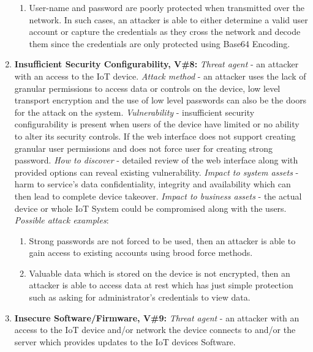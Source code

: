 \documentclass[12pt]{article}
\begin{document}
\begin{enumerate}
\begin{enumerate}[label=(\roman*)]
			\item User-name and password are poorly protected when transmitted over the network. In such cases, an attacker is able to either determine a valid user account or capture the credentials as they cross the network and decode them since the credentials are only protected using Base64 Encoding.
		\end{enumerate}
	\item \textbf{Insufficient Security Configurability, V\#8:}
		\newline \textit{Threat agent} - an attacker with an access to the IoT device.
		\newline \textit{Attack method} - an attacker uses the lack of granular permissions to access data or controls on the device, low level transport encryption and the use of low level passwords can also be the doors for the attack on the system.
		\newline \textit{Vulnerability} - insufficient security configurability is present when users of the device have limited or no ability to alter its security controls. If the web interface does not support creating granular user permissions and does not force user for creating strong password.
		\newline \textit{How to discover} - detailed review of the web interface along with provided options can reveal existing vulnerability.
		\newline \textit{Impact to system assets} - harm to service’s data confidentiality, integrity and availability	which can then lead to complete device takeover.
		\newline \textit{Impact to business assets} - the actual device or whole IoT System could be compromised along with the users. 
		\newline \textit{Possible attack examples}:
		\begin{enumerate}[label=(\roman*)]
			\item Strong passwords are not forced to be used, then an attacker is able to gain access to existing accounts using brood force methods.
			\item Valuable data which is stored on the device is not encrypted, then an attacker is able to access data at rest which has just simple protection such as asking for administrator’s credentials to view data.
		\end{enumerate}
	\item \textbf{Insecure Software/Firmware, V\#9:}
		\newline \textit{Threat agent} - an attacker with an access to the IoT device and/or network the device connects to and/or the server which provides updates to the IoT devices Software.

\end{enumerate}
\end{document}
